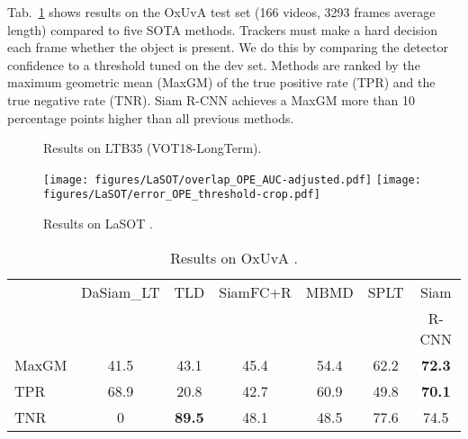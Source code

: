 \documentclass[10pt,twocolumn,letterpaper]{article}
\newcommand{\PAR}[1]{\vskip1pt \noindent {\bf #1~}}
\begin{document}
\PAR{OxUvA.}
Tab.~\ref{tab:oxuva} shows results on the OxUvA test set \cite{Valmadre18ECCV} (166 videos, 3293 frames average length) compared to five SOTA methods. Trackers must make a hard decision each frame whether the object is present. We do this by comparing the detector confidence to a threshold tuned on the dev set. Methods are ranked by the maximum geometric mean (MaxGM) of the true positive rate (TPR) and the true negative rate (TNR). Siam R-CNN achieves a MaxGM more than 10 percentage points higher than all previous methods.


\begin{figure}[t]
\centering
\caption{Results on LTB35 \cite{lukevzivc2018now} (VOT18-LongTerm).} \label{fig:ltb35-res}
\end{figure}

\begin{figure}[t]
\centering
\texttt{[image: figures/LaSOT/overlap\_OPE\_AUC-adjusted.pdf]}
\texttt{[image: figures/LaSOT/error\_OPE\_threshold-crop.pdf]}
\caption{Results on LaSOT \cite{Fan19CVPRLASOT}.}
\label{fig:lasot-res}
\end{figure}

\begin{table}[t]
\centering{}\setlength{\tabcolsep}{2pt}
\footnotesize
\begin{tabular}{lcccccc}
\toprule 
 & {\footnotesize{}DaSiam\_LT} & {\footnotesize{}TLD} & {\footnotesize{}SiamFC+R} & {\footnotesize{}MBMD} & {\footnotesize{}SPLT} & {\footnotesize{}Siam}\tabularnewline
& {\footnotesize{}\cite{Kristan18ECCVW}} & {\footnotesize{}\cite{TLD}} & {\footnotesize{}\cite{Valmadre18ECCV}} & {\footnotesize{}\cite{Zhang18Arxiv}} & {\footnotesize{}\cite{Yan19ICCV}} & {\footnotesize{}R-CNN} \tabularnewline 
\midrule 
{\footnotesize{}MaxGM} & {\footnotesize{}41.5} & {\footnotesize{}43.1} & {\footnotesize{}45.4} & {\footnotesize{}54.4} & {\footnotesize{}62.2} & {\footnotesize{}\textbf{72.3}}\tabularnewline
{\footnotesize{}TPR} & {\footnotesize{}68.9} & {\footnotesize{}20.8} & {\footnotesize{}42.7} & {\footnotesize{}60.9} & {\footnotesize{}49.8} & {\footnotesize{}\textbf{70.1}}\tabularnewline
{\footnotesize{}TNR} & {\footnotesize{}0} & {\footnotesize{}\textbf{89.5}} & {\footnotesize{}48.1} & {\footnotesize{}48.5} & {\footnotesize{}77.6} & {\footnotesize{}74.5}\tabularnewline
\bottomrule
\end{tabular}
\caption{\label{tab:oxuva}Results on OxUvA \cite{Valmadre18ECCV}.}
\end{table}
 
\end{document}
